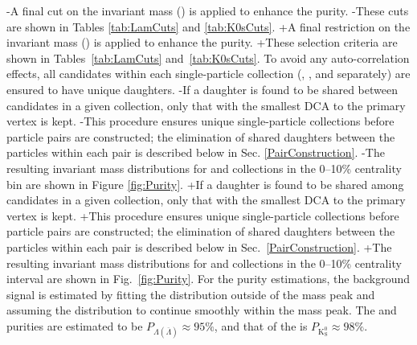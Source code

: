 -A final cut on the invariant mass (\minv) is applied to enhance the purity.
-These cuts are shown in Tables \ref{tab:LamCuts} and \ref{tab:K0sCuts}.
+A final restriction on the invariant mass (\minv) is applied to enhance the purity.
+These selection criteria are shown in Tables~\ref{tab:LamCuts} and~\ref{tab:K0sCuts}.
 To avoid any auto-correlation effects, all \Vz candidates within each single-particle collection (\Lam, \ALam, and \Ks separately) are ensured to have unique daughters. 
-If a daughter is found to be shared between \Vz candidates in a given collection, only that with the smallest DCA to the primary vertex is kept.
-This procedure ensures unique single-particle collections before particle pairs are constructed; the elimination of shared daughters between the particles within each pair is described below in Sec. \ref{PairConstruction}.
-The resulting invariant mass distributions for \Lam and \Ks collections in the 0--10\% centrality bin are shown in Figure \ref{fig:Purity}.
+If a daughter is found to be shared among \Vz candidates in a given collection, only that with the smallest DCA to the primary vertex is kept.
+This procedure ensures unique single-particle collections before particle pairs are constructed; the elimination of shared daughters between the particles within each pair is described below in Sec.~\ref{PairConstruction}.
+The resulting invariant mass distributions for \Lam and \Ks collections in the 0--10\% centrality interval are shown in Fig.~\ref{fig:Purity}.
 For the purity estimations, the background signal is estimated by fitting the \minv distribution outside of the mass peak and assuming the distribution to continue smoothly within the mass peak.
 The \Lam and \ALam purities are estimated to be $P_{\Lambda(\overline{\Lambda})} \approx 95\%$, and that of the \Ks is $P_{\mathrm{K^{0}_{S}}} \approx 98\%$.
 
